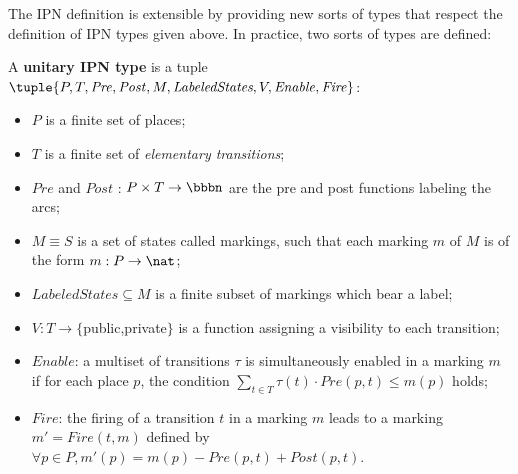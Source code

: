 The IPN definition is extensible by providing new sorts of types that
respect the definition of IPN types given above.  In practice, two
sorts of types are defined:

A \textbf{unitary IPN type} is a tuple
$\tuple{P,T,\mathit{Pre},\mathit{Post},M,\textit{LabeledStates},V,\mathit{Enable},\mathit{Fire}}$:

\begin{itemize}
\item $P$ is a finite set of places;
\item $T$ is a finite set of \emph{elementary transitions};
\item $\mathit{Pre}$ and $\mathit{Post}$ : $P \times T \rightarrow
\bbbn$ are the pre and post functions labeling the arcs;
\item $M \equiv S$ is a set of states called markings, such that each marking $m$ of $M$ is of the form $m : P \rightarrow \nat$;
\item $\textit{LabeledStates} \subseteq M$ is a finite subset of markings which bear a label;
\item $V: T \rightarrow \{$public,private$\}$ is a function assigning a visibility to each transition;
\item $\mathit{Enable}$: a multiset of transitions $\tau$ is simultaneously enabled in a marking $m$
 if for each place $p$, the condition $\sum_{t \in T} \tau(t)\cdot \mathit{Pre}(p,t) \leq m(p)$ holds;
\item $\mathit{Fire}$:  the firing of a transition $t$ in a marking $m$ leads to a marking $m'=\mathit{Fire}(t,m)$ defined
 by $\forall p \in P, m'(p) = m(p) - \mathit{Pre}(p,t) + \mathit{Post}(p,t)$.
\end{itemize}

